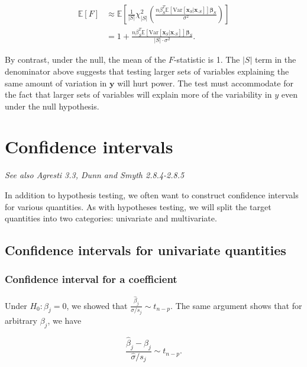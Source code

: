 \documentclass[
  11pt,
  letterpaper,
  oneside]{book}
\theoremstyle{plain}
\theoremstyle{plain}
\theoremstyle{definition}
\theoremstyle{definition}
\theoremstyle{plain}
\theoremstyle{remark}
\begin{document}
\[
\begin{split}
\mathbb{E}[F] &\approx \mathbb{E}\left[\frac{1}{|S|}\chi^2_{|S|}\left(\frac{n\beta_S^T \mathbb{E}[\text{Var}[\boldsymbol{x}_S|\boldsymbol{x}_{\text{-}S}]] \boldsymbol{\beta}_S}{\sigma^2}\right)\right] \\
&= 1 + \frac{n\beta_S^T \mathbb{E}[\text{Var}[\boldsymbol{x}_S|\boldsymbol{x}_{\text{-}S}]] \boldsymbol{\beta}_S}{|S| \cdot \sigma^2}.
\end{split}
\]

By contrast, under the null, the mean of the \(F\)-statistic is 1. The
\(|S|\) term in the denominator above suggests that testing larger sets
of variables explaining the same amount of variation in
\(\boldsymbol{y}\) will hurt power. The test must accommodate for the
fact that larger sets of variables will explain more of the variability
in \(y\) even under the null hypothesis.

\hypertarget{sec-confidence-intervals}{%
\chapter{Confidence intervals}\label{sec-confidence-intervals}}

\emph{See also Agresti 3.3, Dunn and Smyth 2.8.4-2.8.5}

In addition to hypothesis testing, we often want to construct confidence
intervals for various quantities. As with hypotheses testing, we will
split the target quantities into two categories: univariate and
multivariate.

\hypertarget{sec-confidence-intervals-univariate}{%
\section{Confidence intervals for univariate
quantities}\label{sec-confidence-intervals-univariate}}

\hypertarget{confidence-interval-for-a-coefficient}{%
\subsection{Confidence interval for a
coefficient}\label{confidence-interval-for-a-coefficient}}

Under \(H_0: \beta_j = 0\), we showed that
\(\frac{\widehat \beta_j}{\widehat{\sigma}/s_j} \sim t_{n-p}\). The same
argument shows that for arbitrary \(\beta_j\), we have

\[
\frac{\widehat \beta_j - \beta_j}{\widehat{\sigma}/s_j} \sim t_{n-p}.
\]
\end{document}
